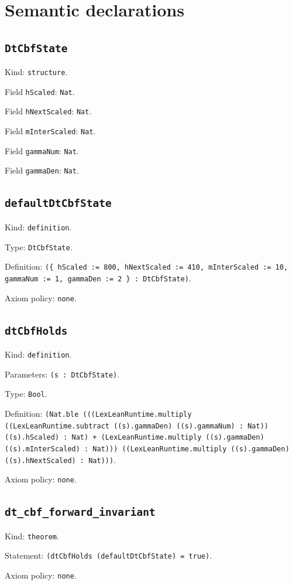 \documentclass[11pt]{article}
\begin{document}
\section*{Semantic declarations}
\subsection*{\texttt{DtCbfState}}
\noindent Kind: \texttt{structure}.\par
\noindent Field \texttt{hScaled}: \texttt{Nat}.\par
\noindent Field \texttt{hNextScaled}: \texttt{Nat}.\par
\noindent Field \texttt{mInterScaled}: \texttt{Nat}.\par
\noindent Field \texttt{gammaNum}: \texttt{Nat}.\par
\noindent Field \texttt{gammaDen}: \texttt{Nat}.\par
\subsection*{\texttt{defaultDtCbfState}}
\noindent Kind: \texttt{definition}.\par
\noindent Type: \texttt{DtCbfState}.\par
\noindent Definition: \texttt{(\{ hScaled := 800, hNextScaled := 410, mInterScaled := 10, gammaNum := 1, gammaDen := 2 \} : DtCbfState)}.\par
\noindent Axiom policy: \texttt{none}.\par
\subsection*{\texttt{dtCbfHolds}}
\noindent Kind: \texttt{definition}.\par
\noindent Parameters: \texttt{(s : DtCbfState)}.\par
\noindent Type: \texttt{Bool}.\par
\noindent Definition: \texttt{(Nat.ble (((LexLeanRuntime.multiply ((LexLeanRuntime.subtract ((s).gammaDen) ((s).gammaNum) : Nat)) ((s).hScaled) : Nat) + (LexLeanRuntime.multiply ((s).gammaDen) ((s).mInterScaled) : Nat))) ((LexLeanRuntime.multiply ((s).gammaDen) ((s).hNextScaled) : Nat)))}.\par
\noindent Axiom policy: \texttt{none}.\par
\subsection*{\texttt{dt\_cbf\_forward\_invariant}}
\noindent Kind: \texttt{theorem}.\par
\noindent Statement: \texttt{(dtCbfHolds (defaultDtCbfState) = true)}.\par
\noindent Axiom policy: \texttt{none}.\par
\end{document}
